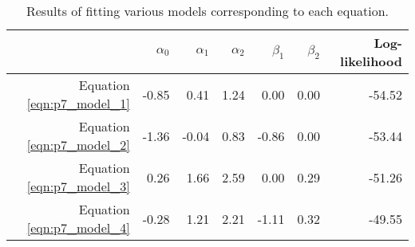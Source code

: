 \begin{table}[ht]
\centering
\begin{tabular}{rrrrrrr}
  \toprule
 & $\alpha_0$ & $\alpha_1$ & $\alpha_2$ & $\beta_1$ & $\beta_2$ & Log-likelihood \\ 
  \midrule
Equation \ref{eqn:p7_model_1} & -0.85 & 0.41 & 1.24 & 0.00 & 0.00 & -54.52 \\ 
  Equation \ref{eqn:p7_model_2} & -1.36 & -0.04 & 0.83 & -0.86 & 0.00 & -53.44 \\ 
  Equation \ref{eqn:p7_model_3} & 0.26 & 1.66 & 2.59 & 0.00 & 0.29 & -51.26 \\ 
  Equation \ref{eqn:p7_model_4} & -0.28 & 1.21 & 2.21 & -1.11 & 0.32 & -49.55 \\ 
   \bottomrule
\end{tabular}
\caption{Results of fitting various models corresponding to each equation.} 
\label{tab:p7_model_summary}
\end{table}
